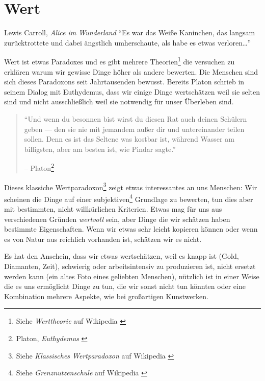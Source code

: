 \chapter{Wert}
\label{les:10}

\begin{chapquote}{Lewis Carroll, \textit{Alice im Wunderland}}
\enquote{Es war das Weiße Kaninchen, das langsam zurücktrottete und dabei
ängstlich umherschaute, als habe es etwas verloren\ldots}
\end{chapquote}

Wert ist etwas Paradoxes und es gibt mehrere Theorien\footnote{Siehe
\textit{Werttheorie} auf Wikipedia \cite{wiki:theory-of-value}} die versuchen zu
erklären warum wir gewisse Dinge höher als andere bewerten. Die Menschen sind
sich dieses Paradoxons seit Jahrtausenden bewusst. Bereits Platon schrieb in
seinem Dialog mit Euthydemus, dass wir einige Dinge wertschätzen weil sie selten
sind und nicht ausschließlich weil sie notwendig für unser Überleben sind.

\begin{quotation}\begin{samepage}
\enquote{Und wenn du besonnen bist wirst du diesen Rat auch deinen Schülern
geben --- den sie nie mit jemandem außer dir und untereinander teilen sollen.
Denn es ist das Seltene was kostbar ist, während Wasser am billigsten, aber am
besten ist, wie Pindar sagte.}
\begin{flushright} -- Platon\footnote{Platon, \textit{Euthydemus} \cite{euthydemus}}
\end{flushright}\end{samepage}\end{quotation}

Dieses klassiche Wertparadoxon\footnote{Siehe \textit{Klassisches Wertparadoxon}
auf Wikipedia \cite{wiki:paradox-of-value}} zeigt etwas interessantes an uns
Menschen: Wir scheinen die Dinge auf einer subjektiven\footnote{Siehe
\textit{Grenznutzenschule} auf Wikipedia \cite{wiki:subjective-theory-of-value}}
Grundlage zu bewerten, tun dies aber mit bestimmten, nicht willkürlichen
Kriterien. Etwas mag für uns aus verschiedenen Gründen \textit{wertvoll} sein,
aber Dinge die wir schätzen haben bestimmte Eigenschaften. Wenn wir etwas sehr
leicht kopieren können oder wenn es von Natur aus reichlich vorhanden ist,
schätzen wir es nicht.

Es hat den Anschein, dass wir etwas wertschätzen, weil es knapp ist (Gold,
Diamanten, Zeit), schwierig oder arbeitsintensiv zu produzieren ist, nicht
ersetzt werden kann (ein altes Foto eines geliebten Menschen), nützlich ist in
einer Weise die es uns ermöglicht Dinge zu tun, die wir sonst nicht tun könnten
oder eine Kombination mehrere Aspekte, wie bei großartigen Kunstwerken.

